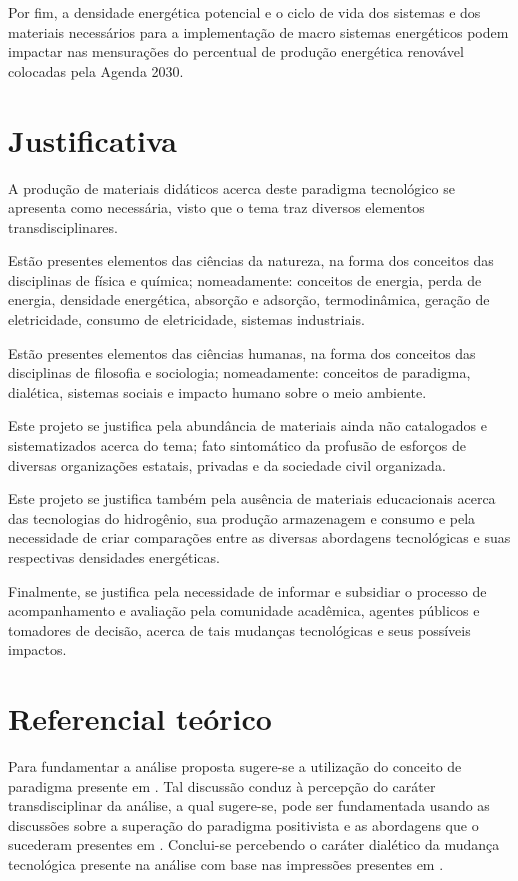 \documentclass[
   article,       %
   12pt,          %
   oneside,       %
   a4paper,       %
   english,       %
   brazil,           %
   sumario=tradicional
   ]{abntex2}
\begin{document}
Por fim, a densidade energética potencial \cite{B815553B} e o ciclo de vida dos sistemas e dos materiais necessários para a implementação de macro sistemas energéticos podem impactar nas mensurações do percentual de produção energética renovável colocadas pela Agenda 2030.




\section{Justificativa}

A produção de materiais didáticos acerca deste paradigma tecnológico se apresenta como necessária, visto que o tema traz diversos elementos transdisciplinares.

Estão presentes elementos das ciências da natureza, na forma dos conceitos das disciplinas de física e química; nomeadamente: conceitos de energia, perda de energia, densidade energética, absorção e adsorção, termodinâmica, geração de eletricidade, consumo de eletricidade, sistemas industriais.

Estão presentes elementos das ciências humanas, na forma dos conceitos das disciplinas de filosofia e sociologia; nomeadamente: conceitos de paradigma, dialética, sistemas sociais e impacto humano sobre o meio ambiente.

Este projeto se justifica pela abundância de materiais ainda não catalogados e sistematizados acerca do tema; fato sintomático da profusão de esforços de diversas organizações estatais, privadas e da sociedade civil organizada.

Este projeto se justifica também pela ausência de materiais educacionais acerca das tecnologias do hidrogênio, sua produção armazenagem e consumo e pela necessidade de criar comparações entre as diversas abordagens tecnológicas e suas respectivas densidades energéticas.

Finalmente, se justifica pela necessidade de informar e subsidiar o processo de acompanhamento e avaliação pela comunidade acadêmica, agentes públicos e tomadores de decisão, acerca de tais mudanças tecnológicas e seus possíveis impactos.





\section{Referencial teórico}

Para fundamentar a análise proposta sugere-se a utilização do conceito de paradigma presente em \cite{Kuhn2012-oa}. Tal discussão conduz à percepção do caráter transdisciplinar da análise, a qual sugere-se, pode ser fundamentada usando as discussões sobre a superação do paradigma positivista e as abordagens que o sucederam presentes em \cite{Lincoln1985-ua}. Conclui-se percebendo o caráter dialético da mudança tecnológica presente na análise com base nas impressões presentes em \cite{DIALECTICAL_TECHNOLOGY}.
\end{document}
